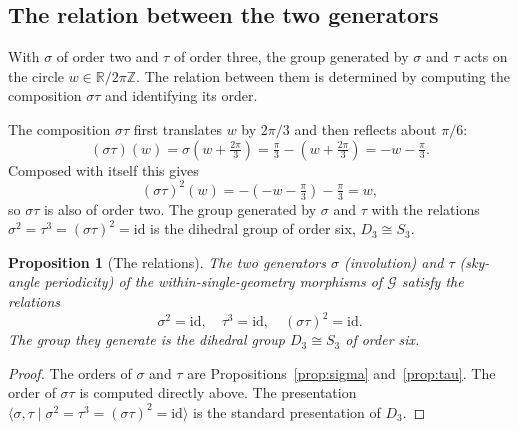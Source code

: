 \documentclass[11pt,a4paper]{article}
\newtheorem{proposition}[theorem]{Proposition}
\theoremstyle{definition}
\begin{document}
\subsection{The relation between the two generators}\label{sec:relations}

With $\sigma$ of order two and $\tau$ of order three, the group generated by $\sigma$ and $\tau$ acts on the circle $w\in\mathbb{R}/2\pi\mathbb{Z}$. The relation between them is determined by computing the composition $\sigma\tau$ and identifying its order.

The composition $\sigma\tau$ first translates $w$ by $2\pi/3$ and then reflects about $\pi/6$:
\begin{equation}
(\sigma\tau)(w) = \sigma(w+\tfrac{2\pi}{3}) = \tfrac{\pi}{3}-\left(w+\tfrac{2\pi}{3}\right) = -w - \tfrac{\pi}{3}.
\end{equation}
Composed with itself this gives
\begin{equation}
(\sigma\tau)^{2}(w) = -(-w-\tfrac{\pi}{3})-\tfrac{\pi}{3} = w,
\end{equation}
so $\sigma\tau$ is also of order two. The group generated by $\sigma$ and $\tau$ with the relations $\sigma^{2}=\tau^{3}=(\sigma\tau)^{2}=\text{id}$ is the dihedral group of order six, $D_{3}\cong S_{3}$.

\begin{proposition}[The relations]\label{prop:relations}
The two generators $\sigma$ (involution) and $\tau$ (sky-angle periodicity) of the within-single-geometry morphisms of $\mathcal{G}$ satisfy the relations
\begin{equation}\label{eq:dihedral}
\sigma^{2}=\text{id},\quad \tau^{3}=\text{id},\quad (\sigma\tau)^{2}=\text{id}.
\end{equation}
The group they generate is the dihedral group $D_{3}\cong S_{3}$ of order six.
\end{proposition}

\begin{proof}
The orders of $\sigma$ and $\tau$ are Propositions~\ref{prop:sigma} and~\ref{prop:tau}. The order of $\sigma\tau$ is computed directly above. The presentation $\langle\sigma,\tau\mid\sigma^{2}=\tau^{3}=(\sigma\tau)^{2}=\text{id}\rangle$ is the standard presentation of $D_{3}$.
\end{proof}
\end{document}
